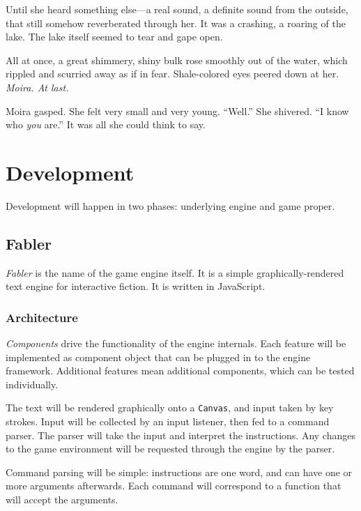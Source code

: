 \documentclass[letterpaper, twoside, 12pt]{memoir}
\begin{document}
Until she heard something else---a real sound, a definite sound from the outside, that still somehow reverberated through her. It was a crashing, a roaring of the lake. The lake itself seemed to tear and gape open.

All at once, a great shimmery, shiny bulk rose smoothly out of the water, which rippled and scurried away as if in fear. Shale-colored eyes peered down at her.
\textit{Moira. At last.}

Moira gasped. She felt very small and very young. 
“Well.” She shivered. “I know who \textit{you} are.” It was all she could think to say.


\chapter{Development}

Development will happen in two phases: underlying engine and game proper.

\section{Fabler}

\textit{Fabler} is the name of the game engine itself. It is a simple graphically-rendered text engine for interactive fiction. It is written in JavaScript. 

\subsection{Architecture}

\textit{Components} drive the functionality of the engine internals. Each feature will be implemented as component object that can be plugged in to the engine framework. Additional features mean additional components, which can be tested individually.

The text will be rendered graphically onto a \texttt{Canvas}, and input taken by key strokes. Input will be collected by an input listener, then fed to a command parser. The parser will take the input and interpret the instructions. Any changes to the game environment will be requested through the engine by the parser. 

Command parsing will be simple: instructions are one word, and can have one or more arguments afterwards. Each command will correspond to a function that will accept the arguments. 
\end{document}

